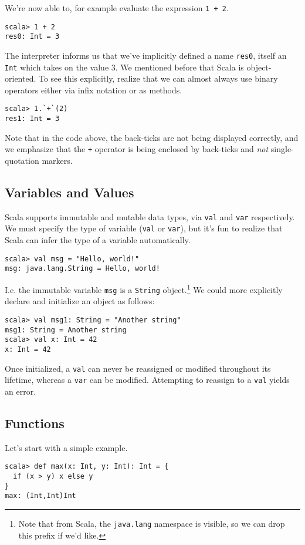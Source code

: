 \documentclass[12pt,letterpaper,twoside]{article}
\begin{document}
We're now able to, for example evaluate the expression \texttt{1 + 2}.
\begin{verbatim}
scala> 1 + 2
res0: Int = 3 \end{verbatim}
The interpreter informs us that we've implicitly defined a name \texttt{res0}, itself
an \texttt{Int} which takes on the value 3. We mentioned before that Scala is object-oriented. To see this explicitly, realize that we can almost always use binary operators
either via infix notation or as methods.
\begin{verbatim}
scala> 1.`+`(2)
res1: Int = 3 
\end{verbatim}
Note that in the code above, the back-ticks are not being displayed correctly, and we 
emphasize that the \texttt{+} operator is being enclosed by back-ticks and 
\emph{not} single-quotation markers.

\subsection{Variables and Values}
Scala supports immutable and mutable data types, via \texttt{val} and \texttt{var} 
respectively. We must specify the type of variable (\texttt{val} or \texttt{var}), but
it's fun to realize that Scala can infer the type of a variable automatically.

\begin{verbatim}
scala> val msg = "Hello, world!"
msg: java.lang.String = Hello, world! \end{verbatim}
I.e. the immutable variable \texttt{msg} is a \texttt{String} object.\footnote{Note that
from Scala, the \texttt{java.lang} namespace is visible, so we can drop this prefix if we'd like.}
We could more explicitly declare and initialize an object as follows:
\begin{verbatim}
scala> val msg1: String = "Another string"
msg1: String = Another string 
scala> val x: Int = 42 
x: Int = 42 \end{verbatim}
 
Once initialized, a \texttt{val} can never be reassigned or modified
throughout its lifetime, whereas a \texttt{var} can be modified. Attempting to reassign
to a \texttt{val} yields an error.

\subsection{Functions} Let's start with a simple example.
\begin{verbatim}
scala> def max(x: Int, y: Int): Int = {
  if (x > y) x else y
}
max: (Int,Int)Int \end{verbatim}
\end{document}
